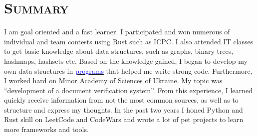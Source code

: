 \vspace*{-3em}
\section{\textsc{Summary}}

I am goal oriented and a fast learner.
I participated and won numerous of individual and team contests using Rust such as ICPC.
I also attended IT classes to get basic knowledge about data structures, such as graphs, binary trees, hashmaps, hashsets etc. Based on the knowledge gained, I began to develop my own data structures in \href{https://github.com/frolvanya/load-testing-tool}{\textcolor{blue}{programs}} that helped me write strong code. 
Furthermore, I worked hard on Minor Academy of Sciences of Ukraine. 
My topic was “development of a document verification system”. 
From this experience, I learned quickly receive information from not the most common sources, as well as to structure and express my thoughts. 
In the past two years I honed Python and Rust skill on LeetCode and CodeWars and wrote a lot of pet projects to learn more frameworks and tools.
